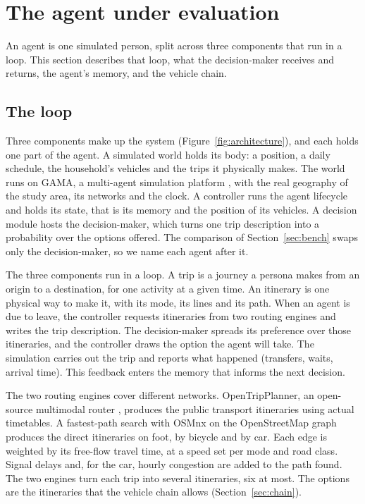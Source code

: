 \section{The agent under evaluation}
\label{sec:agent}

An agent is one simulated person, split across three components that run in a loop. This
section describes that loop, what the decision-maker receives and returns, the agent's
memory, and the vehicle chain.

\subsection{The loop}
\label{sec:loop}

Three components make up the system (Figure~\ref{fig:architecture}), and each holds one part
of the agent. A simulated world holds its body: a position, a daily schedule, the household's
vehicles and the trips it physically makes. The world runs on GAMA, a multi-agent simulation
platform \citep{taillandier2019gama}, with the real geography of the study area, its networks
and the clock. A controller runs the agent lifecycle and holds its state, that is its memory
and the position of its vehicles. A decision module hosts the decision-maker, which turns one
trip description into a probability over the options offered. The comparison of
Section~\ref{sec:bench} swaps only the decision-maker, so we name each agent after it.

The three components run in a loop. A trip is a journey a persona makes from an origin to a
destination, for one activity at a given time. An itinerary is one physical way to make it,
with its mode, its lines and its path. When an agent is due to leave, the controller requests
itineraries from two routing engines and writes the trip description. The decision-maker
spreads its preference over those itineraries, and the controller draws the option the agent
will take. The simulation carries out the trip and reports what happened (transfers, waits,
arrival time). This feedback enters the memory that informs the next decision.

The two routing engines cover different networks. OpenTripPlanner, an open-source
multimodal router \citep{opentripplanner2025}, produces the public transport itineraries
using actual timetables. A fastest-path search with OSMnx \citep{boeing2025osmnx} on the
OpenStreetMap graph produces the direct itineraries on foot, by bicycle and by car. Each edge
is weighted by its free-flow travel time, at a speed set per mode and road class. Signal
delays and, for the car, hourly congestion are added to the path found. The two engines turn
each trip into several itineraries, six at most. The options are the itineraries that the
vehicle chain allows (Section~\ref{sec:chain}).

